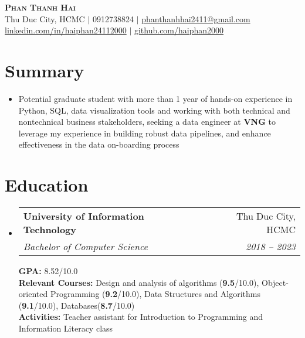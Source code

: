 \documentclass[a4paper,12pt]{article}
\makeatletter
\newcommand{\resumeEducationHeading}[7]{
  \vspace{-2pt}\item
    \begin{tabular*}{0.97\textwidth}[t]{l@{\extracolsep{\fill}}r}
      \textbf{#1} & #2 \\
      \textit{\small#3} & \textit{\small #4} \\
    \end{tabular*}
    \textbf{\small GPA: }{\small#5/10.0} \\
    \textbf{\small Relevant Courses: }{\small#6} \\
    \textbf{\small Activities: }{\small#7} \\
}
\newcommand{\resumeSubHeadingListStart}{\begin{itemize}[leftmargin=0.15in, label={}]}
\newcommand{\resumeSubHeadingListEnd}{\end{itemize}}
\makeatother
\begin{document}
\begin{center}
    \textbf{\Huge \scshape Phan Thanh Hai} \\ \vspace{3pt}
    \small Thu Duc City, HCMC $|$ 0912738824 $|$ \href{mailto:x@x.com}{phanthanhhai2411@gmail.com} \\ \vspace{1pt}
    \href{https://linkedin.com/in/haiphan24112000}{linkedin.com/in/haiphan24112000} $|$
    \href{https://github.com/haiphan2000}{github.com/haiphan2000}
\end{center}

\section{Summary}
\resumeSubHeadingListStart
  \item Potential graduate student with more than 1 year of hands-on experience in Python, SQL, data visualization tools and working with both technical and nontechnical business stakeholders, seeking a data engineer at \textbf{VNG} to leverage my experience in building robust data pipelines, and enhance effectiveness in the data on-boarding process
\resumeSubHeadingListEnd



\section{Education}
  \resumeSubHeadingListStart
    \resumeEducationHeading
      {University of Information Technology}{Thu Duc City, HCMC}
      {Bachelor of Computer Science}{2018 – 2023}
      {8.52}
      {Design and analysis of algorithms (\textbf{9.5}/10.0), Object-oriented Programming (\textbf{9.2}/10.0), Data Structures and Algorithms (\textbf{9.1}/10.0), Databases(\textbf{8.7}/10.0)}
      {Teacher assistant for Introduction to Programming and Information Literacy class}
  \resumeSubHeadingListEnd

%
\end{document}

